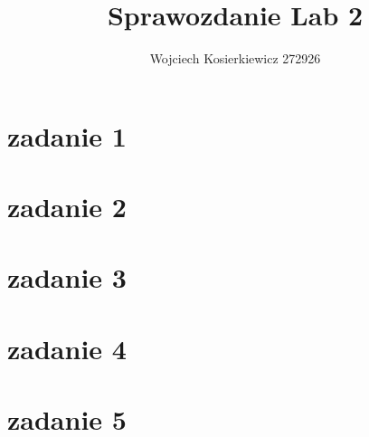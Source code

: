 \documentclass[]{report}
\title{Sprawozdanie Lab 2}
\author{Wojciech Kosierkiewicz 272926}
\begin{document}
	\maketitle
	\newpage
	
	
\section{zadanie 1}

\section{zadanie 2}
\section{zadanie 3}
\section{zadanie 4}
\section{zadanie 5}
\end{document}
